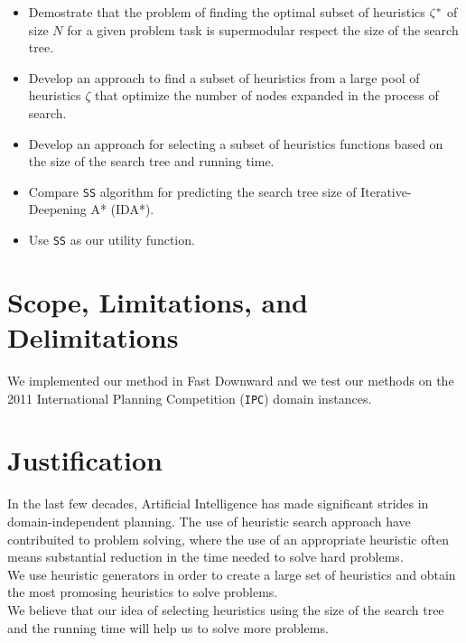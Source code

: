\begin{itemize}
  \item Demostrate that the problem of finding the optimal subset of heuristics $\zeta\sp{*}$ of size $N$ for a given problem task is supermodular respect the size of the search tree.
  
  \item Develop an approach to find a subset of heuristics from a large pool of heuristics $\zeta$ that optimize the number of nodes expanded in the process of search.
  
  \item Develop an approach for selecting a subset of heuristics functions based on the size of the search tree and running time.

  \item Compare \texttt{SS} algorithm for predicting the search tree size of Iterative-Deepening A* (IDA*).
  
  \item Use \texttt{SS} as our utility function.

\end{itemize}
\section{Scope, Limitations, and Delimitations}
\noindent
We implemented our method in Fast Downward \cite{helmert2006fast} and we test our methods on the 2011 International Planning Competition (\texttt{IPC}) domain instances.\\

\section{Justification}
\noindent
In the last few decades, Artificial Intelligence has made significant strides in domain-independent planning. The use of heuristic search approach have contribuited to problem solving, where the use of an appropriate heuristic often means substantial reduction in the time needed to solve hard problems.\\

We use heuristic generators in order to create a large set of heuristics and obtain the most promosing heuristics to solve problems.\\

We believe that our idea of selecting heuristics using the size of the search tree and the running time will help us to solve more problems.

